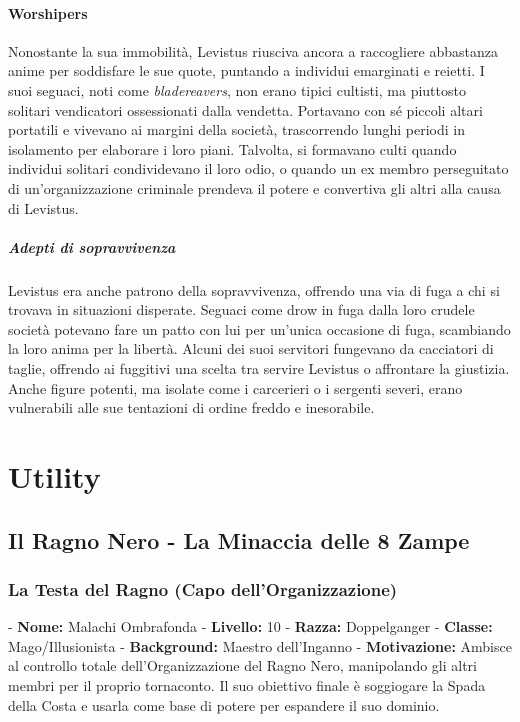 \documentclass{article}
\begin{document}
\paragraph{Worshipers}
Nonostante la sua immobilità, Levistus riusciva ancora a raccogliere abbastanza anime per soddisfare le sue quote, puntando a individui emarginati e reietti. I suoi seguaci, noti come \textit{bladereavers}, non erano tipici cultisti, ma piuttosto solitari vendicatori ossessionati dalla vendetta. Portavano con sé piccoli altari portatili e vivevano ai margini della società, trascorrendo lunghi periodi in isolamento per elaborare i loro piani. Talvolta, si formavano culti quando individui solitari condividevano il loro odio, o quando un ex membro perseguitato di un'organizzazione criminale prendeva il potere e convertiva gli altri alla causa di Levistus.

\subparagraph{Adepti di sopravvivenza}
Levistus era anche patrono della sopravvivenza, offrendo una via di fuga a chi si trovava in situazioni disperate. Seguaci come drow in fuga dalla loro crudele società potevano fare un patto con lui per un'unica occasione di fuga, scambiando la loro anima per la libertà. Alcuni dei suoi servitori fungevano da cacciatori di taglie, offrendo ai fuggitivi una scelta tra servire Levistus o affrontare la giustizia. Anche figure potenti, ma isolate come i carcerieri o i sergenti severi, erano vulnerabili alle sue tentazioni di ordine freddo e inesorabile.

          \section{Utility}


          \subsection{Il Ragno Nero - La Minaccia delle 8 Zampe}

              \subsubsection{ La Testa del Ragno (Capo dell'Organizzazione)}
   - \textbf{Nome:} Malachi Ombrafonda
   - \textbf{Livello:} 10
   - \textbf{Razza:} Doppelganger
   - \textbf{Classe:} Mago/Illusionista
   - \textbf{Background:} Maestro dell'Inganno
   - \textbf{Motivazione:} Ambisce al controllo totale dell'Organizzazione del Ragno Nero, manipolando gli altri membri per il proprio tornaconto. Il suo obiettivo finale è soggiogare la Spada della Costa e usarla come base di potere per espandere il suo dominio.
\end{document}
